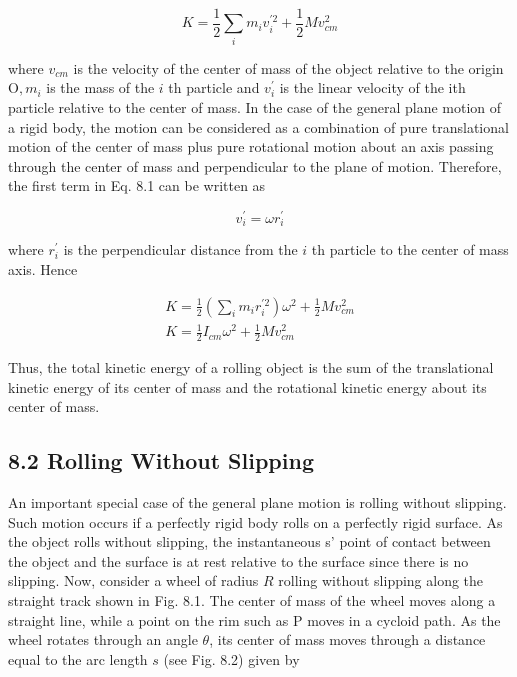 \documentclass[10pt]{article}
\begin{document}
\begin{equation*}
K=\frac{1}{2} \sum_{i} m_{i} v_{i}^{\prime 2}+\frac{1}{2} M v_{c m}^{2} \tag{8.1}
\end{equation*}


where $v_{c m}$ is the velocity of the center of mass of the object relative to the origin $\mathrm{O}, m_{i}$ is the mass of the $i$ th particle and $v_{i}^{\prime}$ is the linear velocity of the ith particle relative to the center of mass. In the case of the general plane motion of a rigid body, the motion can be considered as a combination of pure translational motion of the center of mass plus pure rotational motion about an axis passing through the center of mass and perpendicular to the plane of motion. Therefore, the first term in Eq. 8.1 can be written as

$$
v_{i}^{\prime}=\omega r_{i}^{\prime}
$$

where $r_{i}^{\prime}$ is the perpendicular distance from the $i$ th particle to the center of mass axis. Hence

$$
\begin{gathered}
K=\frac{1}{2}\left(\sum_{i} m_{i} r_{i}^{\prime 2}\right) \omega^{2}+\frac{1}{2} M v_{c m}^{2} \\
K=\frac{1}{2} I_{c m} \omega^{2}+\frac{1}{2} M v_{c m}^{2}
\end{gathered}
$$

Thus, the total kinetic energy of a rolling object is the sum of the translational kinetic energy of its center of mass and the rotational kinetic energy about its center of mass.

\subsection*{8.2 Rolling Without Slipping}
An important special case of the general plane motion is rolling without slipping. Such motion occurs if a perfectly rigid body rolls on a perfectly rigid surface. As the object rolls without slipping, the instantaneous s' point of contact between the object and the surface is at rest relative to the surface since there is no slipping. Now, consider a wheel of radius $R$ rolling without slipping along the straight track shown in Fig. 8.1. The center of mass of the wheel moves along a straight line, while a point on the rim such as P moves in a cycloid path. As the wheel rotates through an angle $\theta$, its center of mass moves through a distance equal to the arc length $s$ (see Fig. 8.2) given by
\end{document}
